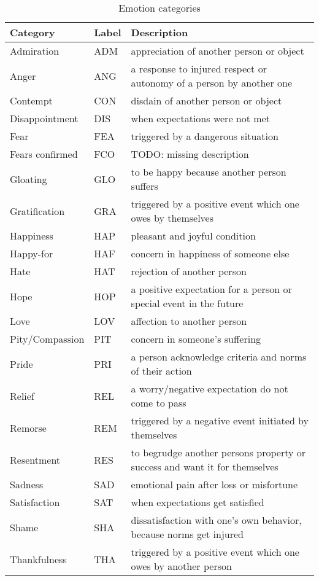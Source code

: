 \begin{table}
  \centering
  \begin{tabular}{llp{8cm}}
    Category & Label & Description \\
    \hline
    Admiration & ADM & appreciation of another person or object \\
    Anger & ANG & a response to injured respect or autonomy of a person by another one \\
    Contempt & CON & disdain of another person or object \\
    Disappointment & DIS & when expectations were not met \\
    Fear & FEA & triggered by a dangerous situation \\
    Fears confirmed & FCO & TODO: missing description \\
    Gloating & GLO & to be happy because another person suffers \\
    Gratification & GRA & triggered by a positive event which one owes by themselves  \\
    Happiness & HAP & pleasant and joyful condition \\
    Happy-for & HAF & concern in happiness of someone else \\
    Hate & HAT & rejection of another person \\
    Hope & HOP & a positive expectation for a person or special event in the future \\
    Love & LOV & affection to another person \\
    Pity/Compassion & PIT & concern in someone's suffering \\
    Pride & PRI & a person acknowledge criteria and norms of their action \\
    Relief & REL & a worry/negative expectation do not come to pass \\
    Remorse & REM & triggered by a negative event initiated by themselves \\
    Resentment & RES & to begrudge another persons property or success and want it for themselves \\
    Sadness & SAD & emotional pain after loss or misfortune \\
    Satisfaction & SAT & when expectations get satisfied \\
    Shame & SHA & dissatisfaction with one's own behavior, because norms get injured \\
    Thankfulness & THA & triggered by a positive event which one owes by another person \\
  \end{tabular}
  \caption{Emotion categories}
  \label{tab:emotion_categories}
\end{table}




